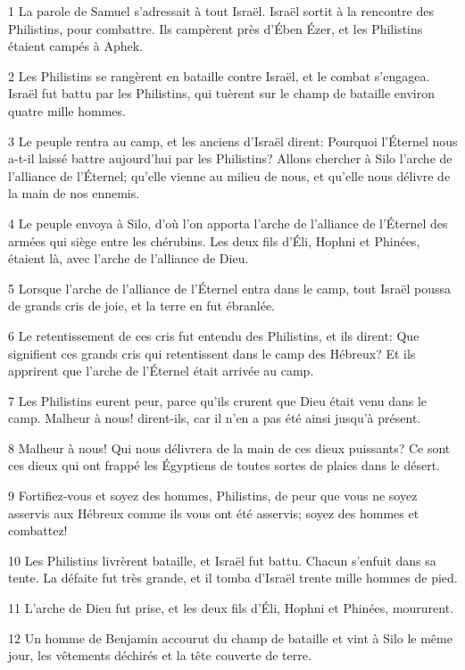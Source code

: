 \par 1 La parole de Samuel s'adressait à tout Israël. Israël sortit à la rencontre des Philistins, pour combattre. Ils campèrent près d'Ében Ézer, et les Philistins étaient campés à Aphek.
\par 2 Les Philistins se rangèrent en bataille contre Israël, et le combat s'engagea. Israël fut battu par les Philistins, qui tuèrent sur le champ de bataille environ quatre mille hommes.
\par 3 Le peuple rentra au camp, et les anciens d'Israël dirent: Pourquoi l'Éternel nous a-t-il laissé battre aujourd'hui par les Philistins? Allons chercher à Silo l'arche de l'alliance de l'Éternel; qu'elle vienne au milieu de nous, et qu'elle nous délivre de la main de nos ennemis.
\par 4 Le peuple envoya à Silo, d'où l'on apporta l'arche de l'alliance de l'Éternel des armées qui siège entre les chérubins. Les deux fils d'Éli, Hophni et Phinées, étaient là, avec l'arche de l'alliance de Dieu.
\par 5 Lorsque l'arche de l'alliance de l'Éternel entra dans le camp, tout Israël poussa de grands cris de joie, et la terre en fut ébranlée.
\par 6 Le retentissement de ces cris fut entendu des Philistins, et ils dirent: Que signifient ces grands cris qui retentissent dans le camp des Hébreux? Et ils apprirent que l'arche de l'Éternel était arrivée au camp.
\par 7 Les Philistins eurent peur, parce qu'ils crurent que Dieu était venu dans le camp. Malheur à nous! dirent-ils, car il n'en a pas été ainsi jusqu'à présent.
\par 8 Malheur à nous! Qui nous délivrera de la main de ces dieux puissants? Ce sont ces dieux qui ont frappé les Égyptiens de toutes sortes de plaies dans le désert.
\par 9 Fortifiez-vous et soyez des hommes, Philistins, de peur que vous ne soyez asservis aux Hébreux comme ils vous ont été asservis; soyez des hommes et combattez!
\par 10 Les Philistins livrèrent bataille, et Israël fut battu. Chacun s'enfuit dans sa tente. La défaite fut très grande, et il tomba d'Israël trente mille hommes de pied.
\par 11 L'arche de Dieu fut prise, et les deux fils d'Éli, Hophni et Phinées, moururent.
\par 12 Un homme de Benjamin accourut du champ de bataille et vint à Silo le même jour, les vêtements déchirés et la tête couverte de terre.

